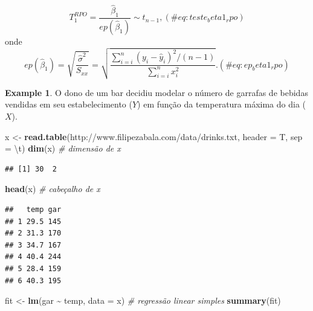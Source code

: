 \documentclass[
]{book}
\newenvironment{Shaded}{\begin{snugshade}}{\end{snugshade}}
\newcommand{\CharTok}[1]{\textcolor[rgb]{0.31,0.60,0.02}{#1}}
\newcommand{\CommentTok}[1]{\textcolor[rgb]{0.56,0.35,0.01}{\textit{#1}}}
\newcommand{\DataTypeTok}[1]{\textcolor[rgb]{0.13,0.29,0.53}{#1}}
\newcommand{\KeywordTok}[1]{\textcolor[rgb]{0.13,0.29,0.53}{\textbf{#1}}}
\newcommand{\NormalTok}[1]{#1}
\newcommand{\OperatorTok}[1]{\textcolor[rgb]{0.81,0.36,0.00}{\textbf{#1}}}
\newcommand{\StringTok}[1]{\textcolor[rgb]{0.31,0.60,0.02}{#1}}
\theoremstyle{definition}
\theoremstyle{definition}
\newtheorem{example}{Example}[chapter]
\theoremstyle{definition}
\theoremstyle{remark}
\begin{document}
\begin{equation}
T_1^{RPO} = \frac{\hat{\beta}_1}{ep(\hat{\beta}_1)} \sim t_{n-1},
(\#eq:teste_beta1_rpo)
\end{equation}
onde
\begin{equation}
ep(\hat{\beta}_1) = \sqrt{\frac{\hat{\sigma}^2}{S_{xx}}} = \sqrt{\frac{\sum_{i=i}^n (y_i - \hat{y}_i)^2 / (n-1)}{\sum_{i=i}^n x_{i}^{2} } }.
(\#eq:ep_beta1_rpo)
\end{equation}

\begin{example}
\protect\hypertarget{exm:unnamed-chunk-125}{}{\label{exm:unnamed-chunk-125} }O dono de um bar decidiu modelar o número de garrafas de bebidas vendidas em seu estabelecimento (\(Y\)) em função da temperatura máxima do dia (\(X\)).
\end{example}

\begin{Shaded}
\begin{Highlighting}[]
\NormalTok{x \textless{}{-}}\StringTok{ }\KeywordTok{read.table}\NormalTok{(}\StringTok{\textquotesingle{}http://www.filipezabala.com/data/drinks.txt\textquotesingle{}}\NormalTok{, }\DataTypeTok{header =}\NormalTok{ T, }\DataTypeTok{sep =} \StringTok{\textquotesingle{}}\CharTok{\textbackslash{}t}\StringTok{\textquotesingle{}}\NormalTok{)}
\KeywordTok{dim}\NormalTok{(x)  }\CommentTok{\# dimensão de x}
\end{Highlighting}
\end{Shaded}

\begin{verbatim}
## [1] 30  2
\end{verbatim}

\begin{Shaded}
\begin{Highlighting}[]
\KeywordTok{head}\NormalTok{(x) }\CommentTok{\# cabeçalho de x}
\end{Highlighting}
\end{Shaded}

\begin{verbatim}
##   temp gar
## 1 29.5 145
## 2 31.3 170
## 3 34.7 167
## 4 40.4 244
## 5 28.4 159
## 6 40.3 195
\end{verbatim}

\begin{Shaded}
\begin{Highlighting}[]
\NormalTok{fit \textless{}{-}}\StringTok{ }\KeywordTok{lm}\NormalTok{(gar }\OperatorTok{\textasciitilde{}}\StringTok{ }\NormalTok{temp, }\DataTypeTok{data =}\NormalTok{ x)       }\CommentTok{\# regressão linear simples}
\KeywordTok{summary}\NormalTok{(fit)}
\end{Highlighting}
\end{Shaded}
\end{document}
